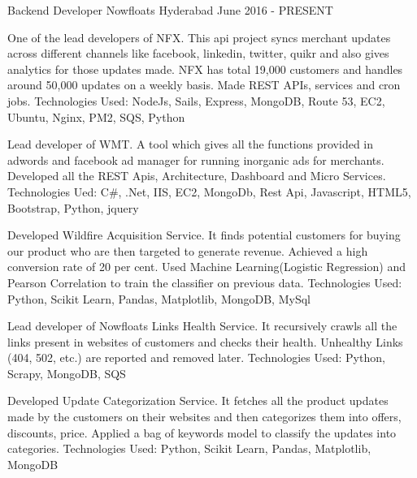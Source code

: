 
\begin{cventries}

  \cventry
    {Backend Developer} %
    {Nowfloats} %
    {Hyderabad} %
    {June 2016 - PRESENT} %
    {
      \begin{cvitems} %
        \item {One of the lead developers of NFX. This api project syncs merchant updates across different channels like facebook, linkedin, twitter, quikr and also gives analytics for those updates made. NFX has total 19,000 customers and handles around 50,000 updates on a weekly basis. Made REST APIs, services and cron jobs. Technologies Used: NodeJs, Sails, Express, MongoDB, Route 53, EC2, Ubuntu, Nginx, PM2, SQS, Python}
        \item {Lead developer of WMT. A tool which gives all the functions provided in adwords and facebook ad manager for running inorganic ads for merchants. Developed all the REST Apis, Architecture, Dashboard and Micro Services. Technologies Ued: C\#, .Net, IIS, EC2, MongoDb, Rest Api, Javascript, HTML5, Bootstrap, Python, jquery}
        \item {Developed Wildfire Acquisition Service. It finds potential customers for buying our product who are then targeted to generate revenue. Achieved a high conversion rate of 20 per cent. Used Machine Learning(Logistic Regression) and Pearson Correlation to train the classifier on previous data. Technologies Used: Python, Scikit Learn, Pandas, Matplotlib, MongoDB, MySql  }
        \item {Lead developer of Nowfloats Links Health Service. It recursively crawls all the links present in websites of customers and checks their health. Unhealthy Links (404, 502, etc.) are reported and removed later. Technologies Used: Python, Scrapy, MongoDB, SQS  }
        \item {Developed Update Categorization Service. It fetches all the product updates made by the customers on their websites and then categorizes them into offers, discounts, price. Applied a bag of keywords model to classify the updates into categories. Technologies Used: Python, Scikit Learn, Pandas, Matplotlib, MongoDB  }
      \end{cvitems}
    }


\end{cventries}

